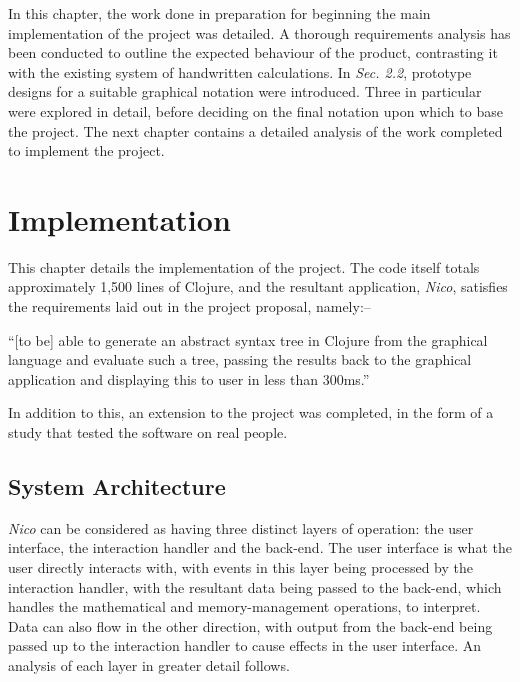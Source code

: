 \documentclass[12pt,twoside,notitlepage,xetex]{report}
\begin{document}
In this chapter, the work done in preparation for beginning the main
implementation of the project was detailed.  A thorough requirements analysis
has been conducted to outline the expected behaviour of the product,
contrasting it with the existing system of handwritten calculations.  In
\emph{Sec. 2.2}, prototype designs for a suitable graphical notation were
introduced.  Three in particular were explored in detail, before deciding on
the final notation upon which to base the project.  The next chapter contains a
detailed analysis of the work completed to implement the project.

\cleardoublepage
\chapter{Implementation}

This chapter details the implementation of the project.  The code itself totals
approximately 1,500 lines of Clojure, and the resultant application,
\emph{Nico}, satisfies the requirements laid out in the project proposal,
namely:--
\begin{center}
\parbox[c]{\textwidth-2cm}{
\small
``[to be] able to generate an abstract syntax tree in Clojure from the graphical language and evaluate such a tree, passing the results back to the graphical application and displaying this to user in less than 300ms.''
}
\end{center}
In addition to this, an extension to the project was completed, in the form of
a study that tested the software on real people.

\section{System Architecture}

\emph{Nico} can be considered as having three distinct layers of operation: the user interface, the interaction handler and the back-end.  The user interface is what the user directly interacts with, with events in this layer being processed by the interaction handler, with the resultant data being passed to the back-end, which handles the mathematical and memory-management operations, to interpret.  Data can also flow in the other direction, with output from the back-end being passed up to the interaction handler to cause effects in the user interface.  An analysis of each layer in greater detail follows.

\end{document}
